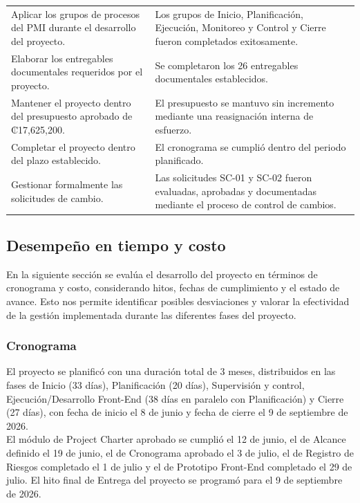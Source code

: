 \documentclass[11pt,spanish]{article}
\begin{document}
\begin{table}[H]
{\begin{tabularx}{\textwidth}{p{6cm}Y}
Aplicar los grupos de procesos del PMI durante el desarrollo del proyecto.
&
Los grupos de Inicio, Planificación, Ejecución, Monitoreo y Control y Cierre fueron completados exitosamente.
\\

Elaborar los entregables documentales requeridos por el proyecto.
&
Se completaron los 26 entregables documentales establecidos.
\\

Mantener el proyecto dentro del presupuesto aprobado de ₡17,625,200.
&
El presupuesto se mantuvo sin incremento mediante una reasignación interna de esfuerzo.
\\

Completar el proyecto dentro del plazo establecido.
&
El cronograma se cumplió dentro del periodo planificado.
\\

Gestionar formalmente las solicitudes de cambio.
&
Las solicitudes SC-01 y SC-02 fueron evaluadas, aprobadas y documentadas mediante el proceso de control de cambios.
\\

\bottomrule
\end{tabularx}
}
\end{table}

\subsection{Desempeño en tiempo y costo}

En la siguiente sección se evalúa el desarrollo del proyecto en términos de cronograma y costo, considerando hitos, fechas de cumplimiento y el estado de avance. Esto nos permite identificar posibles desviaciones y valorar la efectividad de la gestión implementada durante las diferentes fases del proyecto.


\subsubsection{Cronograma}
El proyecto se planificó con una duración total de 3 meses, distribuidos en las fases de Inicio (33 días), Planificación (20 días), Supervisión y control, Ejecución/Desarrollo Front-End (38 días en paralelo con Planificación) y Cierre (27 días), con fecha de inicio el 8 de junio y fecha de cierre el 9 de septiembre de 2026.\\
El módulo de Project Charter aprobado se cumplió el 12 de junio, el de Alcance definido el 19 de junio, el de Cronograma aprobado el 3 de julio, el de Registro de Riesgos completado el 1 de julio y el de Prototipo Front-End completado el 29 de julio. El hito final de Entrega del proyecto se programó para el 9 de septiembre de 2026.
\end{document}
